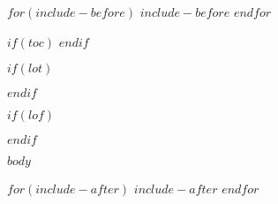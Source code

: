 \documentclass[$if(fontsize)$$fontsize$,$endif$$if(lang)$$lang$,$endif$$if(papersize)$$papersize$,$endif$$for(classoption)$$classoption$$sep$,$endfor$,twoside]{$documentclass$}
\begin{document}
\tiny
\begin{multicols*}{5}
\vspace{-3\baselineskip}
$for(include-before)$
$include-before$
$endfor$

$if(toc)$
{
\hypersetup{linkcolor=black}
\setcounter{tocdepth}{$toc-depth$}
\tableofcontents
}
$endif$

$if(lot)$
\listoftables
$endif$

$if(lof)$
\listoffigures
$endif$

$body$

$for(include-after)$
$include-after$
$endfor$

\end{multicols*}
\end{document}
